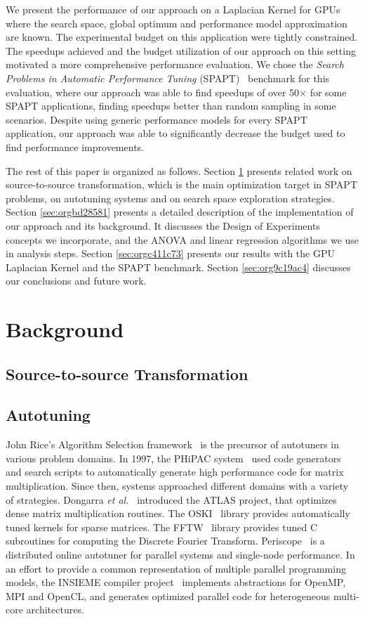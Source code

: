 \documentclass[conference]{IEEEtran}
\begin{document}
We present the performance of our approach on a Laplacian Kernel for GPUs where
the search space, global optimum and performance model approximation are known.
The experimental budget on this application were tightly constrained. The
speedups achieved and the budget utilization of our approach on this setting
motivated a more comprehensive performance evaluation. We chose the \emph{Search
Problems in Automatic Performance Tuning}
(SPAPT)~\cite{balaprakash2012spapt} benchmark for this evaluation, where
our approach was able to find speedups of over 50\(\times\) for some SPAPT
applications, finding speedups better than random sampling in some scenarios.
Despite using generic performance models for every SPAPT application, our
approach was able to significantly decrease the budget used to find performance
improvements.

The rest of this paper is organized as follows. Section \ref{sec:org2774a8e} presents
related work on source-to-source transformation, which is the main optimization
target in SPAPT problems, on autotuning systems and on search space exploration
strategies. Section \ref{sec:orgbd28581} presents a
detailed description of the implementation of our approach and its background.
It discusses the Design of Experiments concepts we incorporate, and the ANOVA
and linear regression algorithms we use in analysis steps. Section \ref{sec:orgc411c73} presents our results with the GPU Laplacian Kernel and the SPAPT
benchmark. Section \ref{sec:org9c19ac4} discusses our conclusions and future work.
\section{Background}
\label{sec:org2774a8e}
\subsection{Source-to-source Transformation}
\label{sec:org993213b}
\subsection{Autotuning}
\label{sec:org92cce5f}
John Rice's Algorithm Selection framework~\cite{rice1976algorithm} is the
precursor of autotuners in various problem domains. In 1997, the PHiPAC
system~\cite{bilmes1997optimizing} used code generators and search scripts
to automatically generate high performance code for matrix multiplication. Since
then, systems approached different domains with a variety of strategies.
Dongarra \emph{et al.}~\cite{dongarra1998automatically} introduced the ATLAS
project, that optimizes dense matrix multiplication routines. The
OSKI~\cite{vuduc2005oski} library provides automatically tuned kernels for
sparse matrices. The FFTW~\cite{frigo1998fftw} library provides tuned C
subroutines for computing the Discrete Fourier Transform.
Periscope~\cite{gerndt2010automatic} is a distributed online autotuner for
parallel systems and single-node performance. In an effort to provide a common
representation of multiple parallel programming models, the INSIEME compiler
project~\cite{jordan2012multi} implements abstractions for OpenMP, MPI and
OpenCL, and generates optimized parallel code for heterogeneous multi-core
architectures.
\end{document}
